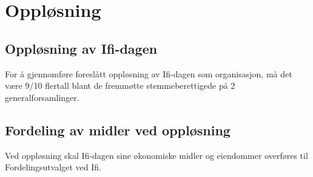 \documentclass[norsk,a4paper]{article}
\providecommand{\DIFaddbegin}{} %
\providecommand{\DIFaddend}{} %
\newcommand{\DIFaddincludegraphics}[2][]{{\color{blue}\fbox{\DIFOincludegraphics[#1]{#2}}}} %
\DeclareRobustCommand{\DIFaddbegin}{\DIFOaddbegin \let\includegraphics\DIFaddincludegraphics} %
\DeclareRobustCommand{\DIFaddend}{\DIFOaddend \let\includegraphics\DIFOincludegraphics} %
\begin{document}
\section{Oppløsning}
\subsection{Oppløsning av Ifi-dagen}
For å gjennomføre foreslått oppløsning av Ifi-dagen som organisasjon, må det være 9/10 flertall
blant de fremmøtte stemmeberettigede på 2 generalforsamlinger.
\DIFaddbegin 

\DIFaddend \subsection{Fordeling av midler ved oppløsning}
Ved oppløsning skal Ifi-dagen sine økonomiske midler og eiendommer overføres til
Fordelingsutvalget ved Ifi.\label{ref:lastpage}
\end{document}
